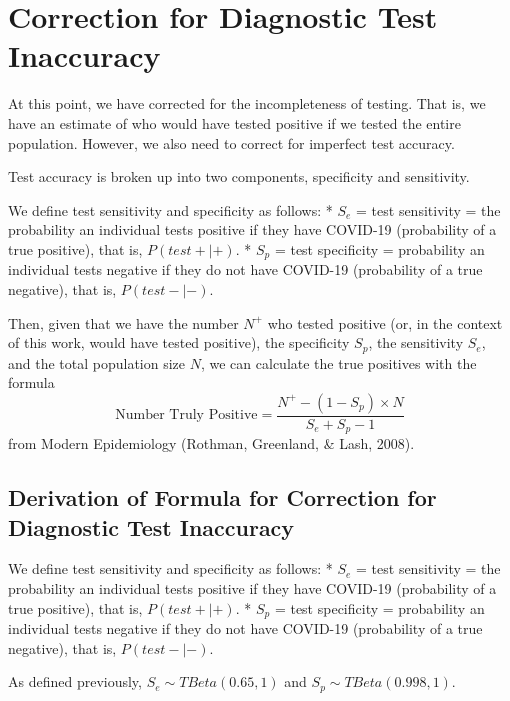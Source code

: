 \documentclass[12pt,twoside]{smiththesis}
\begin{document}
\hypertarget{correction-for-diagnostic-test-inaccuracy}{%
\section{Correction for Diagnostic Test Inaccuracy}\label{correction-for-diagnostic-test-inaccuracy}}

At this point, we have corrected for the incompleteness of testing. That is, we have an estimate of who would have tested positive if we tested the entire population. However, we also need to correct for imperfect test accuracy.

Test accuracy is broken up into two components, specificity and sensitivity.

We define test sensitivity and specificity as follows:
* \(S_e\) = test sensitivity = the probability an individual tests positive if they have COVID-19 (probability of a true positive), that is, \(P(test + | +)\).
* \(S_p\) = test specificity = probability an individual tests negative if they do not have COVID-19 (probability of a true negative), that is, \(P(test - |-)\).

Then, given that we have the number \(N^+\) who tested positive (or, in the context of this work, would have tested positive), the specificity \(S_p\), the sensitivity \(S_e\), and the total population size \(N\), we can calculate the true positives with the formula
\[\text{Number Truly Positive} = \dfrac{N^+ - (1-S_p) \times N}{S_e+S_p-1}\]
from Modern Epidemiology (Rothman, Greenland, \& Lash, 2008).

\hypertarget{derivation-of-formula-for-correction-for-diagnostic-test-inaccuracy}{%
\subsection{Derivation of Formula for Correction for Diagnostic Test Inaccuracy}\label{derivation-of-formula-for-correction-for-diagnostic-test-inaccuracy}}

We define test sensitivity and specificity as follows:
* \(S_e\) = test sensitivity = the probability an individual tests positive if they have COVID-19 (probability of a true positive), that is, \(P(test + | +)\).
* \(S_p\) = test specificity = probability an individual tests negative if they do not have COVID-19 (probability of a true negative), that is, \(P(test - |-)\).

As defined previously, \(S_e \sim TBeta(0.65, 1)\) and \(S_p \sim TBeta(0.998, 1)\).
\end{document}
